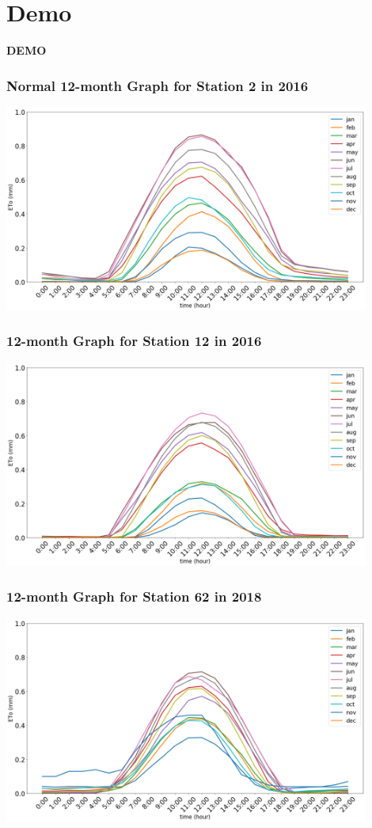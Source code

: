 \section{Demo}
\begin{frame}
	\begin{center}
		{\fontsize{20}{20}\selectfont
			\textbf{DEMO}
		}
	\end{center}
\end{frame}

\begin{frame}
\frametitle{Normal 12-month Graph for Station 2 in 2016}
\centering
\includegraphics[width=0.9\textwidth]{images/2-2016.png}
\end{frame}

\begin{frame}
\frametitle{12-month Graph for Station 12 in 2016}
\centering
\includegraphics[width=0.9\textwidth]{images/12-2016.png}
\end{frame}

\begin{frame}
\frametitle{12-month Graph for Station 62 in 2018}
\centering
\includegraphics[width=0.9\textwidth]{images/62-2018.png}
\end{frame}

